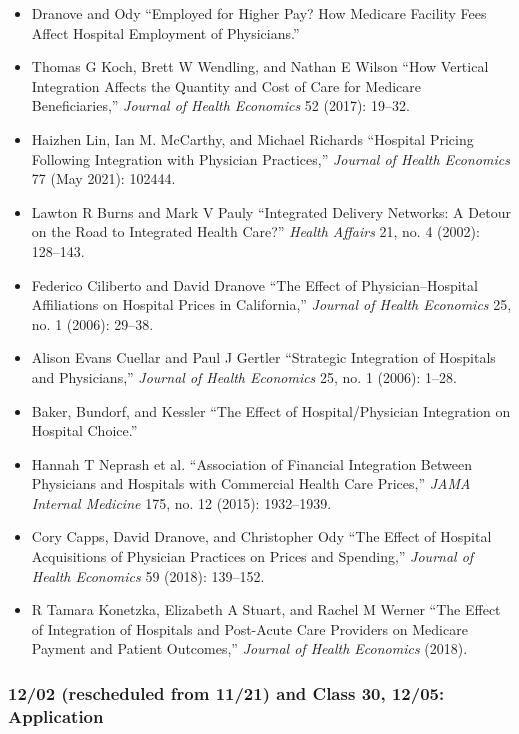 \documentclass[11pt,]{article}
\providecommand{\tightlist}{%
  \setlength{\itemsep}{0pt}\setlength{\parskip}{0pt}}
\begin{document}
\begin{itemize}
\tightlist
\item
  Dranove and Ody {``Employed for Higher Pay? {How} {Medicare} Facility
  Fees Affect Hospital Employment of Physicians.''}
\item
  Thomas G Koch, Brett W Wendling, and Nathan E Wilson {``How Vertical
  Integration Affects the Quantity and Cost of Care for {Medicare}
  Beneficiaries,''} \emph{Journal of Health Economics} 52 (2017):
  19--32.
\item
  Haizhen Lin, Ian M. McCarthy, and Michael Richards {``Hospital
  {Pricing} {Following} {Integration} with {Physician} {Practices},''}
  \emph{Journal of Health Economics} 77 (May 2021): 102444.
\item
  Lawton R Burns and Mark V Pauly {``Integrated Delivery Networks: A
  Detour on the Road to Integrated Health Care?''} \emph{Health Affairs}
  21, no. 4 (2002): 128--143.
\item
  Federico Ciliberto and David Dranove {``The Effect of
  Physician--Hospital Affiliations on Hospital Prices in
  {California},''} \emph{Journal of Health Economics} 25, no. 1 (2006):
  29--38.
\item
  Alison Evans Cuellar and Paul J Gertler {``Strategic Integration of
  Hospitals and Physicians,''} \emph{Journal of Health Economics} 25,
  no. 1 (2006): 1--28.
\item
  Baker, Bundorf, and Kessler {``The {Effect} of {Hospital}/{Physician}
  {Integration} on {Hospital} {Choice}.''}
\item
  Hannah T Neprash et al. {``Association of Financial Integration
  Between Physicians and Hospitals with Commercial Health Care
  Prices,''} \emph{JAMA Internal Medicine} 175, no. 12 (2015):
  1932--1939.
\item
  Cory Capps, David Dranove, and Christopher Ody {``The Effect of
  Hospital Acquisitions of Physician Practices on Prices and
  Spending,''} \emph{Journal of Health Economics} 59 (2018): 139--152.
\item
  R Tamara Konetzka, Elizabeth A Stuart, and Rachel M Werner {``The
  Effect of Integration of Hospitals and Post-Acute Care Providers on
  {Medicare} Payment and Patient Outcomes,''} \emph{Journal of Health
  Economics} (2018).
\end{itemize}

\hypertarget{rescheduled-from-1121-and-class-30-1205-application}{%
\subsubsection{12/02 (rescheduled from 11/21) and Class 30, 12/05:
Application}\label{rescheduled-from-1121-and-class-30-1205-application}}
\end{document}
